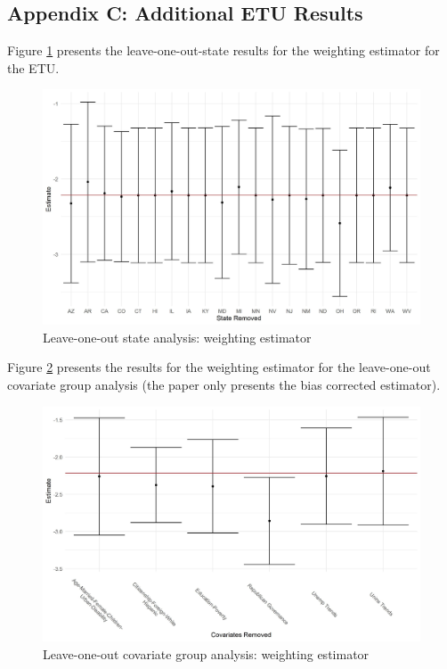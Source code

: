 \documentclass[12pt]{article}
\begin{document}
\subsection{Appendix C: Additional ETU Results}

Figure \ref{loostateswt} presents the leave-one-out-state results for the weighting estimator for the ETU.

\begin{figure}[H]
\begin{center}
    \includegraphics[scale=0.6]{images/loo-states-wt.jpeg}
    \caption{Leave-one-out state analysis: weighting estimator}
    \label{loostateswt}
\end{center}
\end{figure}

Figure \ref{loocovswt} presents the results for the weighting estimator for the leave-one-out covariate group analysis (the paper only presents the bias corrected estimator).

\begin{figure}[H]
\begin{center}
    \includegraphics[scale=0.6]{images/loo-covariates-wgt.jpeg}
    \caption{Leave-one-out covariate group analysis: weighting estimator}
    \label{loocovswt}
\end{center}
\end{figure}
\end{document}
